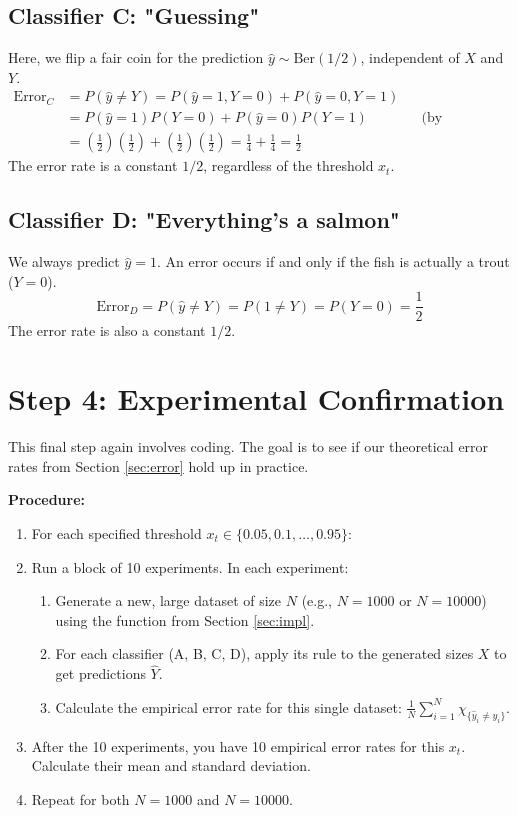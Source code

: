 \documentclass[11pt,a4paper]{article}
\begin{document}
\subsection{Classifier C: "Guessing"}
Here, we flip a fair coin for the prediction $\hat{y} \sim \text{Ber}(1/2)$, independent of $X$ and $Y$.
\begin{align*}
    \text{Error}_C &= P(\hat{y} \neq Y) = P(\hat{y}=1, Y=0) + P(\hat{y}=0, Y=1) \\
    &= P(\hat{y}=1)P(Y=0) + P(\hat{y}=0)P(Y=1) && \text{(by independence)} \\
    &= \left(\frac{1}{2}\right)\left(\frac{1}{2}\right) + \left(\frac{1}{2}\right)\left(\frac{1}{2}\right) = \frac{1}{4} + \frac{1}{4} = \frac{1}{2}
\end{align*}
The error rate is a constant $1/2$, regardless of the threshold $x_t$.

\subsection{Classifier D: "Everything's a salmon"}
We always predict $\hat{y}=1$. An error occurs if and only if the fish is actually a trout ($Y=0$).
\[ \text{Error}_D = P(\hat{y} \neq Y) = P(1 \neq Y) = P(Y=0) = \frac{1}{2} \]
The error rate is also a constant $1/2$.

\section{Step 4: Experimental Confirmation}
\label{sec:exp}
This final step again involves coding. The goal is to see if our theoretical error rates from Section \ref{sec:error} hold up in practice.

\textbf{Procedure:}
\begin{enumerate}
    \item For each specified threshold $x_t \in \{0.05, 0.1, \dots, 0.95\}$:
    \item Run a block of 10 experiments. In each experiment:
    \begin{enumerate}
        \item Generate a new, large dataset of size $N$ (e.g., $N=1000$ or $N=10000$) using the function from Section \ref{sec:impl}.
        \item For each classifier (A, B, C, D), apply its rule to the generated sizes $X$ to get predictions $\hat{Y}$.
        \item Calculate the empirical error rate for this single dataset: $\frac{1}{N}\sum_{i=1}^N \chi_{\{\hat{y}_i \neq y_i\}}$.
    \end{enumerate}
    \item After the 10 experiments, you have 10 empirical error rates for this $x_t$. Calculate their mean and standard deviation.
    \item Repeat for both $N=1000$ and $N=10000$.
\end{enumerate}
\end{document}
